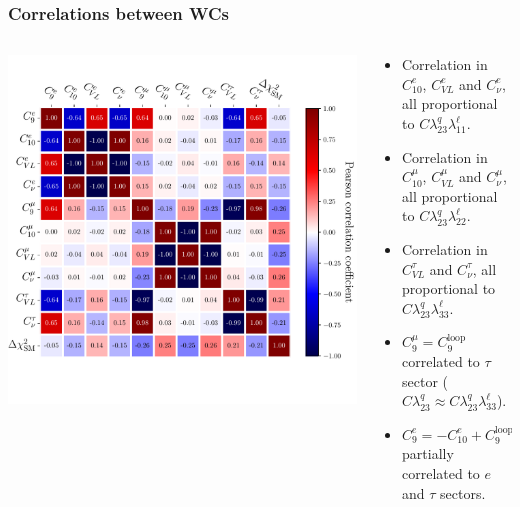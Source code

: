 \documentclass[mathserif, 10pt]{beamer}
\begin{document}
\begin{frame}
    \frametitle{Correlations between WCs}

    \begin{columns}[onlytextwidth]
        \begin{column}{0.6\textwidth}
            \includegraphics[width=\columnwidth,clip]{figures/coeffcorr.pdf}
            
        \end{column}
        \begin{column}{0.4\textwidth}
            \begin{itemize}
                \item Correlation in $C_{10}^e$, $C_{VL}^e$ and $C_\nu^e$, all proportional to $C \lambda^q_{23} \lambda^\ell_{11}$.
                \item Correlation in $C_{10}^\mu$, $C_{VL}^\mu$ and $C_\nu^\mu$, all proportional to $C \lambda^q_{23} \lambda^\ell_{22}$.
                \item Correlation in $C_{VL}^\tau$ and $C_\nu^\tau$, all proportional to $C \lambda^q_{23} \lambda^\ell_{33}$.
                \item $C_9^\mu = C_9^\mathrm{loop}$ correlated to $\tau$ sector ($C\lambda^q_{23} \approx C\lambda^q_{23} \lambda^\ell_{33}$).
                \item $C_9^e = -C_{10}^e + C_9^\mathrm{loop}$ partially correlated to $e$ and $\tau$ sectors.
            \end{itemize}
            
        \end{column}
    \end{columns}

\end{frame}
\end{document}
